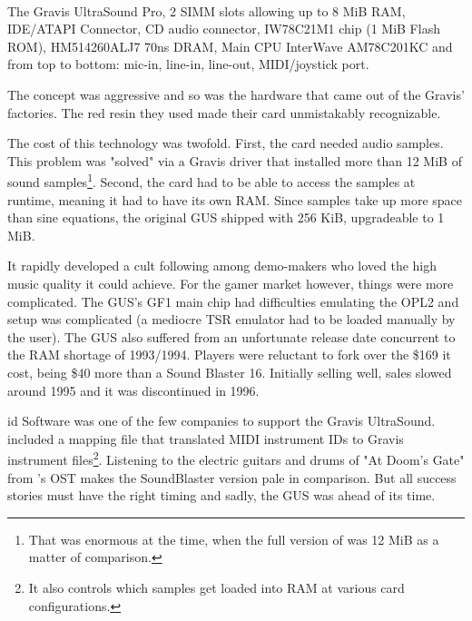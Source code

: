 \\
\par
The Gravis UltraSound Pro,  2 SIMM slots allowing up to 8 MiB RAM,  IDE/ATAPI Connector,  CD audio connector,  IW78C21M1 chip (1 MiB Flash ROM),  HM514260ALJ7 70ns DRAM,  Main CPU InterWave AM78C201KC and  from top to bottom: mic-in, line-in, line-out, MIDI/joystick port.\\

The concept was aggressive and so was the hardware that came out of the Gravis' factories. The red resin they used made their card unmistakably recognizable.\\
\par
The cost of this technology was twofold. First, the card needed audio samples. This problem was "solved" via a Gravis driver that installed more than 12 MiB of sound samples\footnote{That was enormous at the time, when the full version of \doom{} was 12 MiB as a matter of comparison.}. Second, the card had to be able to access the samples at runtime, meaning it had to have its own RAM. Since samples take up more space than sine equations, the original GUS shipped with 256 KiB, upgradeable to 1 MiB.\\
\par
It rapidly developed a cult following among demo-makers who loved the high music quality it could achieve. For the gamer market however, things were more complicated. The GUS's GF1 main chip had difficulties emulating the OPL2 and setup was complicated (a mediocre TSR emulator had to be loaded manually by the user). The GUS also suffered from an unfortunate release date concurrent to the RAM shortage of 1993/1994. Players were reluctant to fork over the \$169 it cost, being \$40 more than a Sound Blaster 16. Initially selling well, sales slowed around 1995 and it was discontinued in 1996.\\
\par
 id Software was one of the few companies to support the Gravis UltraSound. \doom{} included a mapping file that translated MIDI instrument IDs to Gravis  instrument files\footnote{It also controls which samples get loaded into RAM at various card configurations.}. Listening to the electric guitars and drums of "At Doom's Gate" from \doom{}'s OST makes the SoundBlaster version pale in comparison. But all success stories must have the right timing and sadly, the GUS was ahead of its time.\vspace{-5pt}

